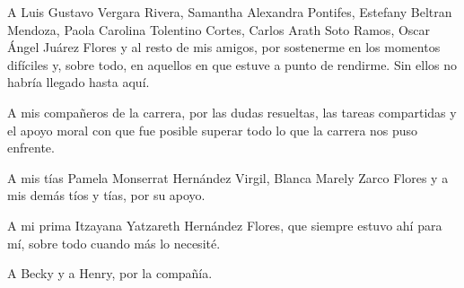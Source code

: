 A Luis Gustavo Vergara Rivera, Samantha Alexandra Pontifes,
Estefany Beltran Mendoza, Paola Carolina Tolentino Cortes,
Carlos Arath Soto Ramos, Oscar Ángel Juárez Flores y al resto de mis
amigos, por sostenerme en los momentos difíciles y, sobre todo, en aquellos
en que estuve a punto de rendirme. Sin ellos no habría llegado hasta aquí.

A mis compañeros de la carrera, por las dudas resueltas, las tareas
compartidas y el apoyo moral con que fue posible superar todo lo que la
carrera nos puso enfrente.

A mis tías Pamela Monserrat Hernández Virgil, Blanca Marely Zarco
Flores y a mis demás tíos y tías, por su apoyo.

A mi prima Itzayana Yatzareth Hernández Flores, que siempre estuvo ahí
para mí, sobre todo cuando más lo necesité.

A Becky y a Henry, por la compañía.

